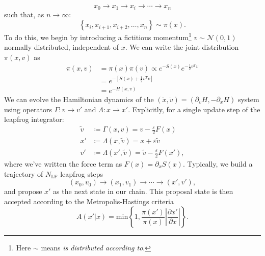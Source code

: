 \documentclass[a4paper,11pt]{article}
\begin{document}
%
\begin{equation}
x_{0} \rightarrow x_{1} \rightarrow x_{i} \rightarrow \cdots \rightarrow x_{n}
\end{equation}
%
such that, as $n \rightarrow \infty$:
%
\begin{equation}
\left\{x_{i}, x_{i+1}, x_{i+2}, \ldots, x_{n}\right\} \sim \pi(x).
\end{equation}
%
To do this, we begin by introducing a fictitious momentum\footnote{Here $\sim$
means \textit{is distributed according to}.} $v \sim \mathcal{N}(0, 1)$
normally distributed, independent of $x$.
%
We can write the joint distribution $\pi(x, v)$ as
%
\begin{align}
\pi(x, v) &= \pi(x) \pi(v) \propto e^{-S(x)} e^{-\frac{1}{2} v^{T}v} \\
&= e^{-\left[S(x) + \frac{1}{2} v^{T} v \right]} \\
&= e^{-H(x, v)}
\end{align}
%
We can evolve the Hamiltonian dynamics of the $(\dot{x}, \dot{v}) =
(\partial_{v} H, -\partial_{x} H)$ system using operators $\Gamma: v
\rightarrow v'$ and $\Lambda: x \rightarrow x'$.
%
Explicitly, for a single update step of the leapfrog integrator:
%
\begin{align}
\tilde{v} &\coloneqq \Gamma(x, v) = v - \frac{\varepsilon}{2} F(x) \\
x' &\coloneqq \Lambda(x, \tilde{v}) = x + \varepsilon \tilde{v} \\
v' &\coloneqq \Lambda(x', \tilde{v}) = \tilde{v} - \frac{\varepsilon}{2} F(x'),
\end{align}
%
where we've written the force term as $F(x) = \partial_{x}S(x)$.
%
Typically, we build a trajectory of $N_{\mathrm{LF}}$ leapfrog steps
%
\begin{equation}
(x_{0}, v_{0}) \rightarrow (x_{1}, v_{1}) \rightarrow \cdots \rightarrow (x', v'),
\end{equation}
%
and propose $x'$ as the next state in our chain.
%
This proposal state is then accepted according to the Metropolis-Hastings
criteria~\cite{robert_metropolis-hastings_2016}
%
\begin{equation}
A(x'|x) = \mathrm{min}\left\{{1, \frac{\pi(x')}{\pi(x)} \left| \frac{\partial x'}{\partial x} \right|}\right\}.
\end{equation}
%
\end{document}
